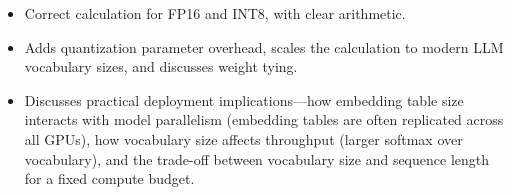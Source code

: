 \begin{interviewq}

\goodgreat
\begin{itemize}
    \item {} Correct calculation for FP16 and INT8, with clear arithmetic.
    \item {} Adds quantization parameter overhead, scales the calculation to modern LLM vocabulary sizes, and discusses weight tying.
    \item {} Discusses practical deployment implications---how embedding table size interacts with model parallelism (embedding tables are often replicated across all GPUs), how vocabulary size affects throughput (larger softmax over vocabulary), and the trade-off between vocabulary size and sequence length for a fixed compute budget.
\end{itemize}

\end{interviewq}


